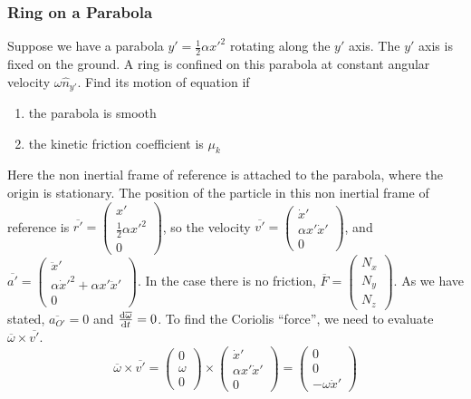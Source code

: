 \documentclass[a4paper,12pt,titlepage]{article}
\begin{document}
\subsubsection{Ring on a Parabola}
Suppose we have a parabola $y'=\frac{1}{2}\alpha x'^2$ rotating along the $y'$ axis. The $y'$ axis is fixed on the ground. A ring is confined on this parabola at constant angular velocity $\omega\hat n_{y'}$. Find its motion of equation if 
\begin{enumerate}
\item{the parabola is smooth}
\item{the kinetic friction coefficient is $\mu_k$}
\end{enumerate} 
Here the non inertial frame of reference is attached to the parabola, where the origin is stationary. The position of the particle in this non inertial frame of reference is $\overline{r'}=\left(\begin{matrix}x'\\\frac{1}{2}\alpha x'^2\\0\end{matrix}\right)$, so the velocity $\overline{v'}=\left(\begin{matrix}\dot x'\\\alpha x'\dot x'\\0\end{matrix}\right)$, and $\overline{a'}=\left(\begin{matrix}\ddot x'\\\alpha \dot x'^2+\alpha x'\ddot x'\\0\end{matrix}\right)$. In the case there is no friction, $\overline {F}=\left(\begin{matrix}N_x\\N_y\\N_z\end{matrix}\right)$. As we have stated, $\overline{a_{O'}}=0$ and $\frac{\mathrm{d} \overline\omega}{\mathrm{d} t}=0$.
To find the Coriolis ``force'', we need to evaluate $\overline\omega\times\overline{v'}$.
\[\overline{\omega}\times\overline{v'}=\left(\begin{matrix}0\\\omega\\0\end{matrix}\right)\times\left(\begin{matrix}\dot x'\\\alpha x'\dot x'\\0\end{matrix}\right)=\left(\begin{matrix}0\\0\\-\omega\dot x'\end{matrix}\right)\]
\end{document}
